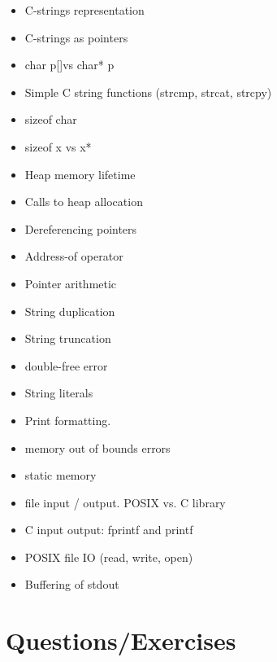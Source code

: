 \begin{itemize}
	\tightlist
	\item
	      C-strings representation
	\item
	      C-strings as pointers
	\item
	      char p{[}{]}vs char* p
	\item
	      Simple C string functions (strcmp, strcat, strcpy)
	\item
	      sizeof char
	\item
	      sizeof x vs x*
	\item
	      Heap memory lifetime
	\item
	      Calls to heap allocation
	\item
	      Dereferencing pointers
	\item
	      Address-of operator
	\item
	      Pointer arithmetic
	\item
	      String duplication
	\item
	      String truncation
	\item
	      double-free error
	\item
	      String literals
	\item
	      Print formatting.
	\item
	      memory out of bounds errors
	\item
	      static memory
	\item
	      file input / output. POSIX vs. C library
	\item
	      C input output: fprintf and printf
	\item
	      POSIX file IO (read, write, open)
	\item
	      Buffering of stdout
\end{itemize}

\section{Questions/Exercises}

